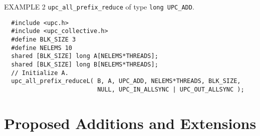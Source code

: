 %
%
%
%
%
%
%
\np EXAMPLE 2 {\tt upc\_all\_prefix\_reduce} of type {\tt long UPC\_ADD}.

\begin{verbatim}
  #include <upc.h>
  #include <upc_collective.h>
  #define BLK_SIZE 3
  #define NELEMS 10
  shared [BLK_SIZE] long A[NELEMS*THREADS];
  shared [BLK_SIZE] long B[NELEMS*THREADS];
  // Initialize A.
  upc_all_prefix_reduceL( B, A, UPC_ADD, NELEMS*THREADS, BLK_SIZE,
                          NULL, UPC_IN_ALLSYNC | UPC_OUT_ALLSYNC );
\end{verbatim}

\pagebreak
\appendix
\section{Proposed Additions and Extensions}

